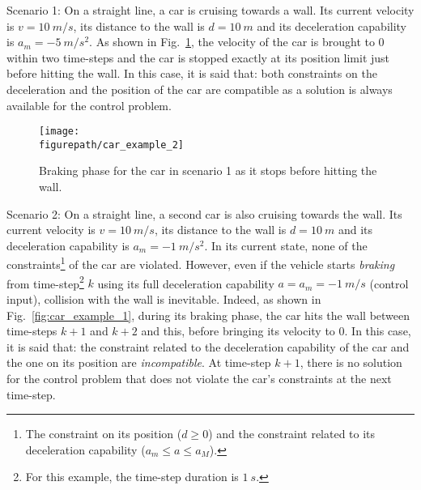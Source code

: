 Scenario 1: On a straight line, a car is cruising towards a wall. Its current velocity is $v=10~m/s$, its distance to the wall is $d=10~m$ and its deceleration capability is $a_{m}=-5~m/s^2$. As shown in Fig.~\ref{fig:car_example_2}, the velocity of the car is brought to $0$ within two time-steps and the car is stopped exactly at its position limit just before hitting the wall. In this case, it is said that: both constraints on the deceleration and the position of the car are compatible as a solution is always available for the control problem. \\
\begin{figure}[!ht]
\centering
\texttt{[image: \\figurepath/car\_example\_2]}
\caption{Braking phase for the car in scenario 1 as it stops before hitting the wall.}
\label{fig:car_example_2}
\end{figure}
Scenario 2: On a straight line, a second car is also  cruising towards the wall. Its current velocity is $v=10~m/s$, its distance to the wall is $d=10~m$ and its deceleration capability is $a_{m}=-1~m/s^2$. In its current state, none of the constraints\footnote{The constraint on its position ($d \geq 0$) and the constraint related to its deceleration capability ($a_m \leq a \leq a_M$).} of the car are violated. However, even if the vehicle starts \textit{braking} from time-step\footnote{For this example, the time-step duration is $1~s$.} $k$ using its full deceleration capability $a=a_{m}=-1~m/s$ (control input), collision with the wall is inevitable. Indeed, as shown in Fig.~\ref{fig:car_example_1}, during its braking phase, the car hits the wall between time-steps $k+1$ and $k+2$ and this, before bringing its velocity to $0$. In this case, it is said that: the constraint related to the deceleration capability of the car and the one on its position are \textit{incompatible}. At time-step $k+1$, there is no solution for the control problem that does not violate the car's constraints at the next time-step. \\
